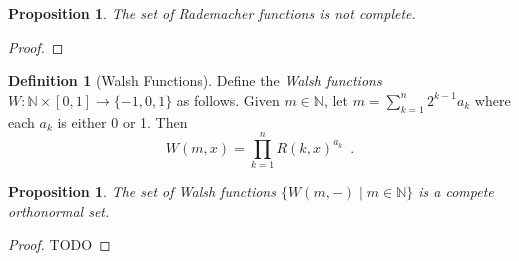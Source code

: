 \documentclass{book}
\let\qed\relax
\newtheorem{prop}[ax]{Proposition}
\theoremstyle{definition}
\newtheorem{df}[ax]{Definition}
\begin{document}
\begin{prop}
The set of Rademacher functions is not complete.
\end{prop}

\begin{proof}
\pf
{}
\qed
\end{proof}

\begin{df}[Walsh Functions]
Define the \emph{Walsh functions} $W : \mathbb{N} \times [0,1] \rightarrow \{-1,0,1\}$ as follows. Given $m \in \mathbb{N}$, let $m = \sum_{k=1}^n 2^{k-1} a_k$ where each $a_k$ is either 0 or 1. Then
\[ W(m,x) = \prod_{k=1}^n R(k,x)^{a_k} \enspace . \]
\end{df}

\begin{prop}
The set of Walsh functions $\{ W(m,-) \mid m \in \mathbb{N} \}$ is a compete orthonormal set.
\end{prop}

\begin{proof}
TODO
\end{proof}
\end{document}
